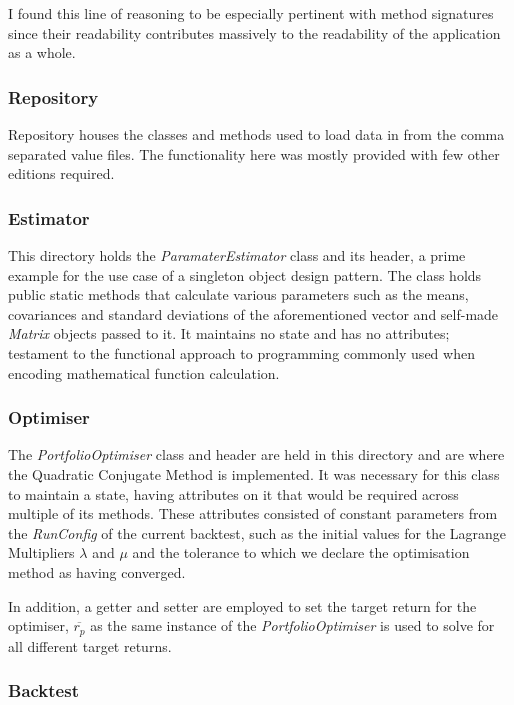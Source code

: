 \documentclass{article}
\begin{document}
I found this line of reasoning to be especially pertinent with method signatures since their readability contributes massively to the readability of the application as a whole.  


\subsubsection{Repository}
\label{sec:repository}

Repository houses the classes and methods used to load data in from the comma separated value files. The functionality here was mostly provided with few other editions required.


\subsubsection{Estimator}
\label{sec:parameter_estimation}

This directory holds the \textit{ParamaterEstimator} class and its header, a prime example for the use case of a singleton object design pattern. The class holds public static methods that calculate various parameters such as the means, covariances and standard deviations of the aforementioned vector and self-made \textit{Matrix} objects passed to it. It maintains no state and has no attributes; testament to the functional approach to programming commonly used when encoding mathematical function calculation.

\subsubsection{Optimiser}
\label{sec:portfolio_optimiser}

The \textit{PortfolioOptimiser} class and header are held in this directory and are where the Quadratic Conjugate Method is implemented. It was necessary for this class to maintain a state, having attributes on it that would be required across multiple of its methods. These attributes consisted of constant parameters from the \textit{RunConfig} of the current backtest, such as the initial values for the Lagrange Multipliers $\lambda$ and $\mu$ and the tolerance to which we declare the optimisation method as having converged.

In addition, a getter and setter are employed to set the target return for the optimiser, $\overline{r_p}$ as the same instance of the \textit{PortfolioOptimiser} is used to solve for all different target returns.

\subsubsection{Backtest}
\label{sec:backtestcode}
\end{document}
